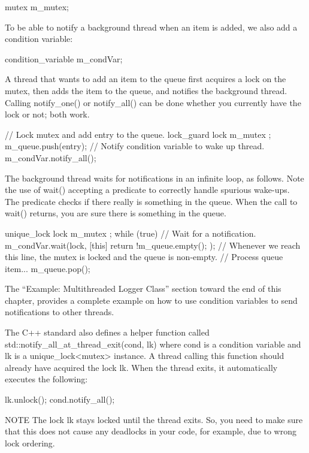 \begin{cpp}
mutex m_mutex;
\end{cpp}

To be able to notify a background thread when an item is added, we also add a condition variable:

\begin{cpp}
condition_variable m_condVar;
\end{cpp}

A thread that wants to add an item to the queue first acquires a lock on the mutex, then adds the item to the queue, and notifies the background thread. Calling notify\_one() or notify\_all() can be done whether you currently have the lock or not; both work.

\begin{cpp}
// Lock mutex and add entry to the queue.
lock_guard lock { m_mutex };
m_queue.push(entry);
// Notify condition variable to wake up thread.
m_condVar.notify_all();
\end{cpp}

The background thread waits for notifications in an infinite loop, as follows. Note the use of wait() accepting a predicate to correctly handle spurious wake-ups. The predicate checks if there really is something in the queue. When the call to wait() returns, you are sure there is something in the queue.

\begin{cpp}
unique_lock lock { m_mutex };
while (true) {
    // Wait for a notification.
    m_condVar.wait(lock, [this]{ return !m_queue.empty(); });
    // Whenever we reach this line, the mutex is locked and the queue is non-empty.
    // Process queue item...
    m_queue.pop();
}
\end{cpp}

The “Example: Multithreaded Logger Class” section toward the end of this chapter, provides a complete example on how to use condition variables to send notifications to other threads.

The C++ standard also defines a helper function called std::notify\_all\_at\_thread\_exit(cond, lk) where cond is a condition variable and lk is a unique\_lock<mutex> instance. A thread calling this function should already have acquired the lock lk. When the thread exits, it automatically executes the following:

\begin{cpp}
lk.unlock();
cond.notify_all();
\end{cpp}

\begin{myNotic}{NOTE}
The lock lk stays locked until the thread exits. So, you need to make sure that this does not cause any deadlocks in your code, for example, due to wrong lock ordering.
\end{myNotic}





